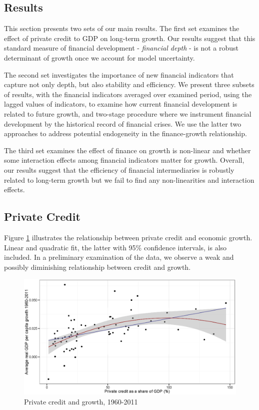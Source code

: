 \begin{refsection}
%
%
%
%
%
\section{Results}
\label{ch2sec:Results}
This section presents two sets of our main results. The first set examines the effect of private credit to GDP on long-term growth. Our results suggest that this standard measure of financial development - \textit{financial depth} - is not a robust determinant of growth once we account for model uncertainty.

The second set investigates the importance of new financial indicators that capture not only depth, but also stability and efficiency. We present three subsets of results, with the financial indicators averaged over examined period, using the lagged values of indicators, to examine how current financial development is related to future growth, and two-stage procedure where we instrument financial development by the historical record of financial crises. We use the latter two approaches to address potential endogeneity in the finance-growth relationship. 

The third set examines the effect of finance on growth is non-linear and whether some interaction effects among financial indicators matter for growth. Overall, our results suggest that the efficiency of financial intermediaries is robustly related to long-term growth but we fail to find any non-linearities and interaction effects.

%
%
\subsection{Private Credit}
\label{ch2subsec:PC}
%
Figure \ref{ch2fig:OLSPCGDP} illustrates the relationship between private credit and economic growth. Linear and quadratic fit, the latter with 95\% confidence intervals, is also included. In a preliminary examination of the data, we observe a weak and possibly diminishing relationship between credit and growth.
%
\begin{figure}[!ht]
	\centering
		\caption{Private credit and growth, 1960-2011}
		\label{ch2fig:OLSPCGDP}
		\includegraphics[width=\linewidth]{Figures/ch2/PConGDP1960-2011.eps}
\end{figure}


\end{refsection}
